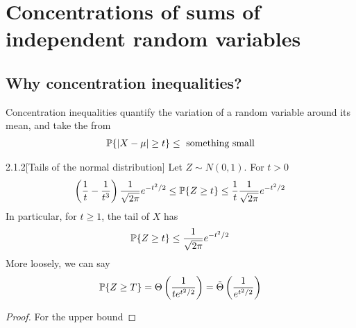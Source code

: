 
\section{Concentrations of sums of independent random variables}

\subsection{Why concentration inequalities?}

Concentration inequalities quantify the variation of a random variable around its mean, and take the from
\begin{align*}
    \P \{|X - \mu | \geq t\} \leq \text{ something small}
\end{align*}

\begin{prop}{2.1.2}[Tails of the normal distribution]\label{2.1.2}
Let $Z \sim N(0,1)$. For $t>0$
\begin{align*}
    \l( \frac 1 t - \frac1{t^3} \r) \frac 1 {\sqrt {2\pi}}e^{-t^2 / 2} \leq \P \{Z \geq t\} \leq \frac1t \frac 1 {\sqrt {2\pi}}e^{-t^2 / 2}
\end{align*}
In particular, for $t\geq 1$, the tail of $X$ has
\begin{align*}
    \P \{Z \geq t\} \leq \frac 1 {\sqrt {2\pi}}e^{-t^2 / 2}
\end{align*}
More loosely, we can say 
\begin{align*}
\P \{Z \geq T\} = \Theta\l(\frac 1 {t e^{t^2/2}}\r) = \tilde{\Theta}\l(\frac 1 {e^{t^2 / 2}}\r)
\end{align*}
\end{prop}

\begin{proof}
    For the upper bound
\end{proof}

